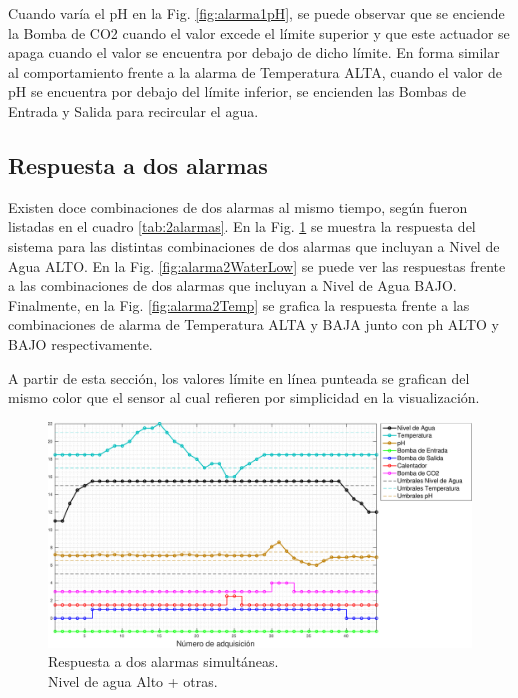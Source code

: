 Cuando varía el pH en la Fig. \ref{fig:alarma1pH}, se puede observar que se enciende la Bomba de CO2 cuando el valor excede el límite superior y que este actuador se apaga cuando el valor se encuentra por debajo de dicho límite.  En forma similar al comportamiento frente a la alarma de Temperatura ALTA, cuando el valor de pH se encuentra por debajo del límite inferior, se encienden las Bombas de Entrada y Salida para recircular el agua.

\subsection{Respuesta a dos alarmas}
\label{sec:2alarma}

Existen doce combinaciones de dos alarmas al mismo tiempo, según fueron listadas en el cuadro \ref{tab:2alarmas}. En la Fig. \ref{fig:alarma2WaterHigh} se muestra la respuesta del sistema para las distintas combinaciones de dos alarmas que incluyan a Nivel de Agua ALTO.  En la Fig. \ref{fig:alarma2WaterLow} se puede ver las respuestas frente a las combinaciones de dos alarmas que incluyan a Nivel de Agua BAJO. Finalmente, en la Fig. \ref{fig:alarma2Temp} se grafica la respuesta frente a las combinaciones de alarma de Temperatura ALTA y BAJA junto con ph ALTO y BAJO respectivamente.

A partir de esta sección, los valores límite en línea punteada se grafican del mismo color que el sensor al cual refieren por simplicidad en la visualización.

\begin{figure}[h]
\centering
    \includegraphics[width=\textwidth]{./Figures/plot2waterHigh.pdf}
	\caption{Respuesta a dos alarmas simultáneas.\\ Nivel de agua Alto + otras.}
	\label{fig:alarma2WaterHigh}
\end{figure}

